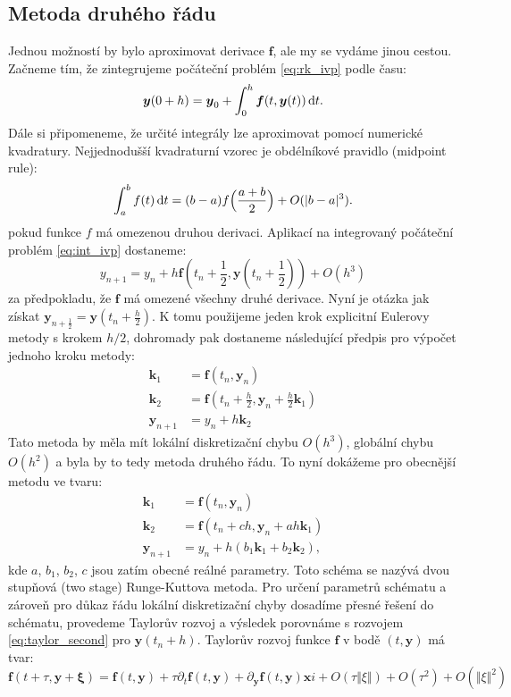 \documentclass[a4paper, 12pt]{book}
\theoremstyle{definition}
\def\d{\,{\rm d}}               %
\def\vc#1{\mathbf{\boldsymbol{#1}}}     %
\def\abs#1{\lvert#1\rvert}
\def\norm#1{\bigl\Vert#1\bigr\Vert} %
\def\prtl{\partial}                                        %
\begin{document}
\subsection{Metoda druhého řádu}
Jednou možností by bylo aproximovat derivace $\vc f$, ale my se vydáme jinou cestou. Začneme tím, že zintegrujeme počáteční problém \eqref{eq:rk_ivp}
podle času:
\begin{equation}
   \label{eq:int_ivp}
   \vc y(0 + h) = \vc y_0 + \int_{0}^h \vc f(t, \vc y(t)) \d t.
\end{equation}
Dále si připomeneme, že určité integrály lze aproximovat pomocí numerické kvadratury. Nejjednodušší kvadraturní vzorec je obdélníkové pravidlo
(midpoint rule):
\[
    \int_a^b f(t) \d t = (b-a)f\Big(\frac{a+b}{2}\Big) + O(\abs{b-a}^3).
\]
pokud funkce $f$ má omezenou druhou derivaci. Aplikací na integrovaný počáteční problém \eqref{eq:int_ivp} dostaneme:
\[
    y_{n+1} = y_n + h\vc f(t_n + \frac12, \vc y(t_n + \frac12)) + O(h^3)
\]
za předpokladu, že $\vc f$ má omezené všechny druhé derivace. Nyní je otázka jak získat $\vc y_{n+\frac12} = \vc y(t_n + \frac{h}{2})$.
K tomu použijeme jeden krok explicitní Eulerovy metody s krokem $h/2$, dohromady pak dostaneme následující předpis pro výpočet jednoho kroku metody:
\begin{align}
    \label{eq:midpoint_rule}
    \vc k_1 &= \vc f(t_n, \vc y_n)\\
    \vc k_2 &= \vc f(t_n + \frac{h}{2}, \vc y_n + \frac{h}{2} \vc k_1)\\
    \vc y_{n+1} &= y_n + h \vc k_2 
\end{align}
Tato metoda by měla mít lokální diskretizační chybu $O(h^3)$, globální chybu $O(h^2)$ a byla by to tedy metoda druhého řádu. To nyní dokážeme
pro obecnější metodu ve tvaru:
\begin{align}
    \label{eq:rk2}
    \vc k_1 &= \vc f(t_n, \vc y_n)\\
    \vc k_2 &= \vc f(t_n + ch, \vc y_n + ah\vc k_1)\\
    \vc y_{n+1} &= y_n + h(b_1 \vc k_1 + b_2 \vc k_2),
\end{align}
kde $a$, $b_1$, $b_2$, $c$ jsou zatím obecné reálné parametry. Toto schéma se nazývá dvou stupňová (two stage) Runge-Kuttova metoda.
Pro určení parametrů schématu a zároveň pro důkaz řádu lokální diskretizační chyby dosadíme přesné řešení do schématu, provedeme Taylorův rozvoj 
a výsledek porovnáme s rozvojem \eqref{eq:taylor_second} pro $\vc y(t_n + h)$. Taylorův rozvoj funkce $\vc f$ v bodě $(t, \vc y)$ má tvar:
\[
    \vc f(t + \tau, \vc y + \vc \xi) = \vc f(t,\vc y) + \tau \prtl_t \vc f(t,\vc y) + \prtl_{\vc y} \vc f(t, \vc y) \vc xi  
     + O(\tau \norm{\xi}) + O(\tau^2) + O(\norm{\xi}^2)
\]
\end{document}
